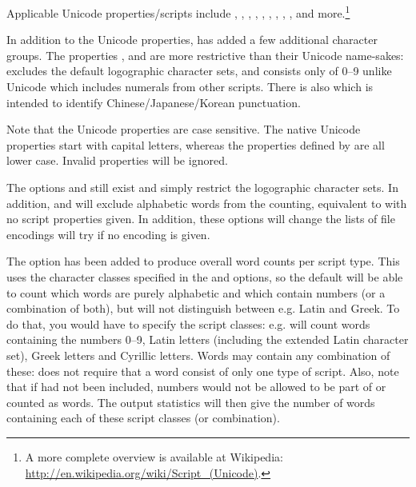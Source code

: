 \documentclass{article}
\begin{document}
Applicable Unicode properties/scripts include , , , , , , , , , and more.\footnote{A more complete overview is available at Wikipedia: \url{http://en.wikipedia.org/wiki/Script_(Unicode)}.}

In addition to the Unicode properties, \TeXcount{} has added a few additional character groups. The properties ,  and  are more restrictive than their Unicode name-sakes:  excludes the default logographic character sets, and  consists only of 0--9 unlike Unicode  which includes numerals from other scripts. There is also  which is intended to identify Chinese/Japanese/Korean punctuation.

Note that the Unicode properties are case sensitive. The native Unicode properties start with capital letters, whereas the properties defined by \TeXcount{} are all lower case. Invalid properties will be ignored.

The options  and  still exist and simply restrict the logographic character sets. In addition,  and  will exclude alphabetic words from the counting, equivalent to  with no script properties given. In addition, these options will change the lists of file encodings \TeXcount{} will try if no encoding is given.

The option  has been added to produce overall word counts per script type. This uses the character classes specified in the  and  options, so the default will be able to count which words are purely alphabetic and which contain numbers (or a combination of both), but will not distinguish between e.g. Latin and Greek. To do that, you would have to specify the script classes: e.g.
will count words containing the numbers 0--9, Latin letters (including the extended Latin character set), Greek letters and Cyrillic letters. Words may contain any combination of these: \TeXcount{} does not require that a word consist of only one type of script. Also, note that if  had not been included, numbers would not be allowed to be part of or counted as words. The output statistics will then give the number of words containing each of these script classes (or combination).
\end{document}
